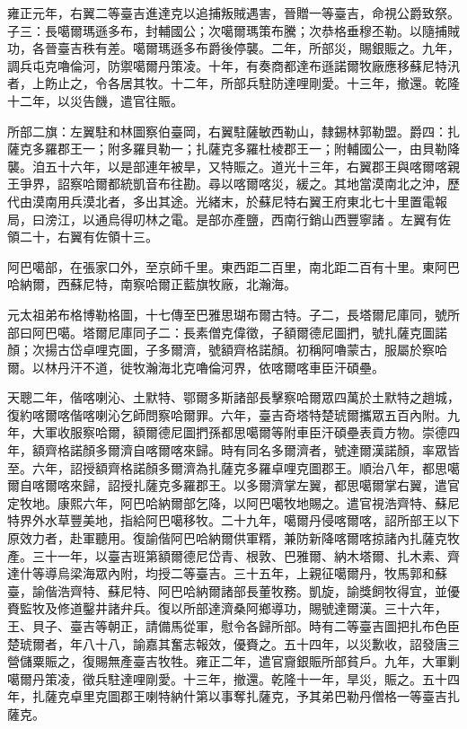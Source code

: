 \begin{pinyinscope}
雍正元年，右翼二等臺吉進達克以追捕叛賊遇害，晉贈一等臺吉，命視公爵致祭。子三：長噶爾瑪遜多布，封輔國公；次噶爾瑪策布騰；次恭格垂穆丕勒。以隨捕賊功，各晉臺吉秩有差。噶爾瑪遜多布爵後停襲。二年，所部災，賜銀賑之。九年，調兵屯克嚕倫河，防禦噶爾丹策凌。十年，有奏商都達布遜諾爾牧廠應移蘇尼特汛者，上飭止之，令各居其牧。十二年，所部兵駐防達哩剛愛。十三年，撤還。乾隆十二年，以災告饑，遣官往賑。

所部二旗：左翼駐和林圖察伯臺岡，右翼駐薩敏西勒山，隸錫林郭勒盟。爵四：扎薩克多羅郡王一；附多羅貝勒一；扎薩克多羅杜棱郡王一；附輔國公一，由貝勒降襲。洎五十六年，以是部連年被旱，又特賑之。道光十三年，右翼郡王與喀爾喀親王爭界，詔察哈爾都統凱音布往勘。尋以喀爾喀災，緩之。其地當漠南北之沖，歷代由漠南用兵漠北者，多出其途。光緒末，於蘇尼特右翼王府東北七十里置電報局，曰滂江，以通烏得叨林之電。是部亦產鹽，西南行銷山西豐寧諸。左翼有佐領二十，右翼有佐領十三。

阿巴噶部，在張家口外，至京師千里。東西距二百里，南北距二百有十里。東阿巴哈納爾，西蘇尼特，南察哈爾正藍旗牧廠，北瀚海。

元太祖弟布格博勒格圖，十七傳至巴雅思瑚布爾古特。子二，長塔爾尼庫同，號所部曰阿巴噶。塔爾尼庫同子二：長素僧克偉徵，子額爾德尼圖捫，號扎薩克圖諾顏；次揚古岱卓哩克圖，子多爾濟，號額齊格諾顏。初稱阿嚕蒙古，服屬於察哈爾。以林丹汗不道，徙牧瀚海北克嚕倫河界，依喀爾喀車臣汗碩壘。

天聰二年，偕喀喇沁、土默特、鄂爾多斯諸部長擊察哈爾眾四萬於土默特之趙城，復約喀爾喀偕喀喇沁乞師問察哈爾罪。六年，臺吉奇塔特楚琥爾攜眾五百內附。九年，大軍收服察哈爾，額爾德尼圖捫孫都思噶爾等附車臣汗碩壘表貢方物。崇德四年，額齊格諾顏多爾濟自喀爾喀來歸。時有同名多爾濟者，號達爾漢諾顏，率眾皆至。六年，詔授額齊格諾顏多爾濟為扎薩克多羅卓哩克圖郡王。順治八年，都思噶爾自喀爾喀來歸，詔授扎薩克多羅郡王。以多爾濟掌左翼，都思噶爾掌右翼，遣官定牧地。康熙六年，阿巴哈納爾部乞降，以阿巴噶牧地賜之。遣官視浩齊特、蘇尼特界外水草豐美地，指給阿巴噶移牧。二十九年，噶爾丹侵喀爾喀，詔所部王以下原效力者，赴軍聽用。復諭偕阿巴哈納爾供軍糈，兼防新降喀爾喀掠諸內扎薩克牧產。三十一年，以臺吉班第額爾德尼岱青、根敦、巴雅爾、納木塔爾、扎木素、齊達什等導烏梁海眾內附，均授二等臺吉。三十五年，上親征噶爾丹，牧馬郭和蘇臺，諭偕浩齊特、蘇尼特、阿巴哈納爾諸部長董牧務。凱旋，諭獎飼牧得宜，並優賚監牧及修道鑿井諸弁兵。復以所部達濟桑阿鄉導功，賜號達爾漢。三十六年，王、貝子、臺吉等朝正，請備馬從軍，慰令各歸所部。時有二等臺吉圖把扎布色臣楚琥爾者，年八十八，諭嘉其奮志報效，優賚之。五十四年，以災歉收，詔發唐三營儲粟賑之，復賜無產臺吉牧牲。雍正二年，遣官齎銀賑所部貧戶。九年，大軍剿噶爾丹策凌，徵兵駐達哩剛愛。十三年，撤還。乾隆十一年，旱災，賑之。五十四年，扎薩克卓里克圖郡王喇特納什第以事奪扎薩克，予其弟巴勒丹僧格一等臺吉扎薩克。


\end{pinyinscope}
